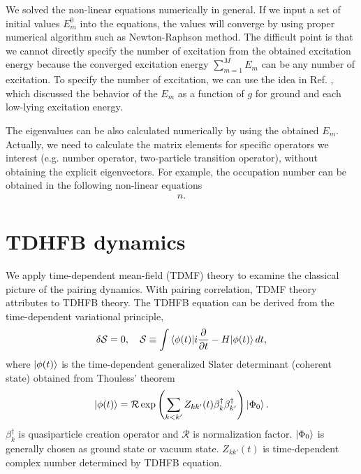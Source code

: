 \documentclass[11pt]{book} %
\begin{document}
We solved the non-linear equations numerically in general. If we input a set of initial values $E_{m}^{0}$ into the equations, the values will converge by using proper numerical algorithm such as Newton-Raphson method. The difficult point is that we cannot directly specify the number of excitation from the obtained excitation energy because the converged excitation energy $\sum_{m=1}^M E_{m}$ can be any number of excitation. To specify the number of excitation, we can use the idea in Ref. \cite{Richardson4}, which discussed the behavior of the $E_{m}$ as a function of $g$ for ground and each low-lying excitation energy. 

The eigenvalues can be also calculated numerically by using the obtained $E_{m}$. Actually, we need to calculate the matrix elements for specific operators we interest (e.g. number operator, two-particle transition operator), without obtaining the explicit eigenvectors. For example, the occupation number can be obtained in the following non-linear equations
\begin{align}
n.
\end{align}

\section{TDHFB dynamics}
\label{2-2}
We apply time-dependent mean-field (TDMF) theory to examine the classical picture of the pairing dynamics. With pairing correlation, TDMF theory attributes to TDHFB theory.
The TDHFB equation can be derived from the time-dependent variational principle,
\begin{equation}
  \delta\mathcal{S}=0, \quad 
  \mathcal{S} \equiv \int \braket{\phi(t)|i\frac{\partial}{\partial t}-H|\phi(t)}dt ,
  \label{variation}
\end{equation}
where $\ket{\phi(t)}$ is the time-dependent generalized Slater determinant (coherent state) obtained from Thouless' theorem
\begin{equation}
  \ket{\phi(t)} = \mathcal{R}\exp{\left( \sum_{k<k'}Z_{kk'}(t)\beta_k^{\dag}\beta_{k'}^{\dag}
    \right)}\ket{\Phi_0} .
\end{equation}
$\beta_k^{\dag}$ is quasiparticle creation operator and $\mathcal{R}$ is normalization factor. $\ket{\Phi_0}$ is generally chosen as ground state or vacuum state. $Z_{kk'}(t)$ is time-dependent complex number determined by TDHFB equation.
\end{document}
